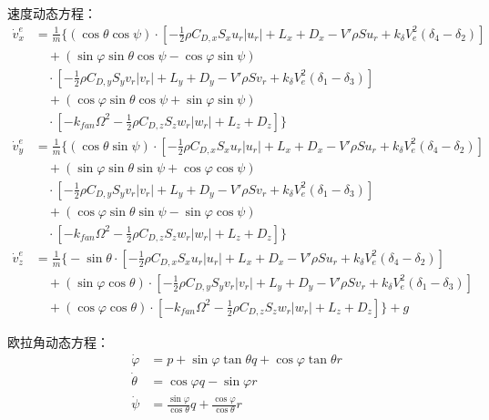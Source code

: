 速度动态方程：
\begin{equation}
    \begin{aligned}
        \dot{v}_{x}^{e} & =\frac{1}{m}\Bigg\{ (\cos{\theta}\cos{\psi}) 
        \cdot\left[-\frac{1}{2}\rho C_{D,x}S_xu_r|u_r|+L_x+D_x - V'\rho S u_r + k_\delta V_e^2(\delta_4 - \delta_2)\right] \\
        & \quad+ (\sin{\varphi}\sin{\theta}\cos{\psi}-\cos{\varphi}\sin{\psi}) \\
        & \quad\cdot\left[-\frac{1}{2}\rho C_{D,y}S_yv_r|v_r|+L_y+D_y - V'\rho S v_r + k_\delta V_e^2(\delta_1 - \delta_3)\right] \\
        & \quad+ (\cos{\varphi}\sin{\theta}\cos{\psi}+\sin{\varphi}\sin{\psi}) \\
        & \quad\cdot\left[-k_{fan}\Omega^2-\frac{1}{2}\rho C_{D,z}S_zw_r|w_r|+L_z+D_z\right]
        \Bigg\}
        \\
        \dot{v}_{y}^{e} & =\frac{1}{m}\Bigg\{ (\cos{\theta}\sin{\psi}) \cdot\left[-\frac{1}{2}\rho C_{D,x}S_xu_r|u_r|+L_x+D_x - V'\rho S u_r + k_\delta V_e^2(\delta_4 - \delta_2)\right] \\
        & \quad+ (\sin{\varphi}\sin{\theta}\sin{\psi}+\cos{\varphi}\cos{\psi}) \\
        & \quad\cdot\left[-\frac{1}{2}\rho C_{D,y}S_yv_r|v_r|+L_y+D_y - V'\rho S v_r + k_\delta V_e^2(\delta_1 - \delta_3)\right] \\
        & \quad+ (\cos{\varphi}\sin{\theta}\sin{\psi}-\sin{\varphi}\cos{\psi}) \\
        & \quad\cdot\left[-k_{fan}\Omega^2-\frac{1}{2}\rho C_{D,z}S_zw_r|w_r|+L_z+D_z\right]
        \Bigg\}
        \\
        \dot{v}_{z}^{e} & =\frac{1}{m}\Bigg\{ -\sin{\theta}\cdot\left[-\frac{1}{2}\rho C_{D,x}S_xu_r|u_r|+L_x+D_x - V'\rho S u_r + k_\delta V_e^2(\delta_4 - \delta_2)\right] \\
        & \quad+ (\sin{\varphi}\cos{\theta})\cdot\left[-\frac{1}{2}\rho C_{D,y}S_yv_r|v_r|+L_y+D_y - V'\rho S v_r + k_\delta V_e^2(\delta_1 - \delta_3)\right] \\
        & \quad+ (\cos{\varphi}\cos{\theta}) \cdot\left[-k_{fan}\Omega^2-\frac{1}{2}\rho C_{D,z}S_zw_r|w_r|+L_z+D_z\right]
        \Bigg\}+g
    \end{aligned}
    \label{eq_41}
\end{equation}

欧拉角动态方程：
\begin{equation}
    \begin{aligned}
        \dot{\varphi}&=p+\sin{\varphi}\tan{\theta}q+\cos{\varphi}\tan{\theta}r\\
        \dot{\theta}&=\cos{\varphi}q-\sin{\varphi}r\\
        \dot{\psi}&=\frac{\sin{\varphi}}{\cos{\theta}}q+\frac{\cos{\varphi}}{\cos{\theta}}r
    \end{aligned}
    \label{eq_42}
\end{equation}

